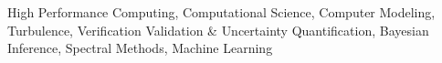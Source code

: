 

High Performance Computing, Computational Science, Computer Modeling, Turbulence,
Verification Validation \& Uncertainty Quantification, Bayesian
Inference, Spectral Methods, Machine Learning

